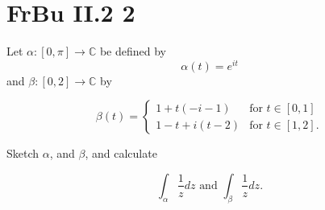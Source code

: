 \section{FrBu II.2 2}

\begin{tcolorbox}[width=\textwidth,
colback={shadecolor},
title={Question:},colbacktitle=white,coltitle=black]

    Let $\alpha : [0, \pi] \rightarrow \mathbb{C} $ be defined by
    $$\alpha(t) = e^{it}$$
    and $\beta : [0, 2] \rightarrow \mathbb{C} $ by

    \[
        \beta(t)=\left\{
        \begin{array}{lll}
            1 + t(-i-1) & \text{for } t \in [0,1]\\
            1 - t +i(t-2) & \text{for } t \in [1,2].
        \end{array}
        \right.
    \]

    Sketch $\alpha$, and $\beta$, and calculate

    $$ \int_{\alpha} \frac{1}{z} dz \text{ and } \int_{\beta} \frac{1}{z} dz.$$

\end{tcolorbox}

